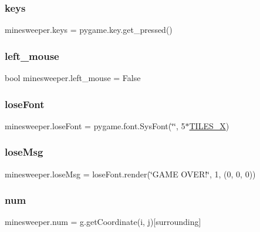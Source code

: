 \subsubsection{\texorpdfstring{keys}{keys}}
{\footnotesize\ttfamily minesweeper.\+keys = pygame.\+key.\+get\+\_\+pressed()}

\mbox{\label{namespaceminesweeper_afe681c4dafd3b5d1a4673343b0d8becd}} 
\subsubsection{\texorpdfstring{left\_mouse}{left\_mouse}}
{\footnotesize\ttfamily bool minesweeper.\+left\+\_\+mouse = False}

\mbox{\label{namespaceminesweeper_a91b8bac9c1df867502bf8012eb6deadb}} 
\subsubsection{\texorpdfstring{loseFont}{loseFont}}
{\footnotesize\ttfamily minesweeper.\+lose\+Font = pygame.\+font.\+Sys\+Font(\char`\"{}\char`\"{}, 5$\ast$\mbox{\hyperlink{namespaceminesweeper_ac9707e38bc10ae8def8674e284754df2}{T\+I\+L\+E\+S\+\_\+X}})}

\mbox{\label{namespaceminesweeper_a25f42eeff70bbdebf714d066168c27f5}} 
\subsubsection{\texorpdfstring{loseMsg}{loseMsg}}
{\footnotesize\ttfamily minesweeper.\+lose\+Msg = lose\+Font.\+render(\char`\"{}G\+A\+ME O\+V\+E\+R!\char`\"{}, 1, (0, 0, 0))}

\mbox{\label{namespaceminesweeper_ab98a5a8f716307b1802794c8b8531461}} 
\subsubsection{\texorpdfstring{num}{num}}
{\footnotesize\ttfamily minesweeper.\+num = g.\+get\+Coordinate(i, j)\mbox{[}\textquotesingle{}surrounding\textquotesingle{}\mbox{]}}

